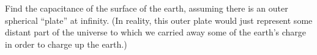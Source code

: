         Find the capacitance of the surface of the
        earth, assuming there is an outer spherical ``plate'' at infinity.
        (In reality, this outer plate would just represent some distant
        part of the universe to which we carried away some of the earth's charge
        in order to charge up the earth.)\answercheck
